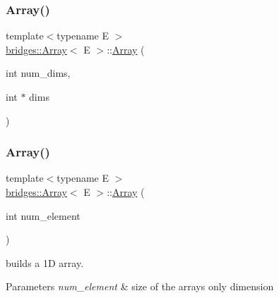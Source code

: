 \mbox{\label{classbridges_1_1_array_a25ff771f9ba7f365465f309ed2dd3688}} 
\subsubsection{\texorpdfstring{Array()}{Array()}\hspace{0.1cm}{\footnotesize\ttfamily [2/6]}}
{\footnotesize\ttfamily template$<$typename E $>$ \\
\mbox{\hyperlink{classbridges_1_1_array}{bridges\+::\+Array}}$<$ E $>$\+::\mbox{\hyperlink{classbridges_1_1_array}{Array}} (\begin{DoxyParamCaption}\item[{int}]{num\+\_\+dims,  }\item[{int $\ast$}]{dims }\end{DoxyParamCaption})\hspace{0.3cm}{\ttfamily [inline]}}

\mbox{\label{classbridges_1_1_array_a859819bc374aa90fcd84b1314034fbbf}} 
\subsubsection{\texorpdfstring{Array()}{Array()}\hspace{0.1cm}{\footnotesize\ttfamily [3/6]}}
{\footnotesize\ttfamily template$<$typename E $>$ \\
\mbox{\hyperlink{classbridges_1_1_array}{bridges\+::\+Array}}$<$ E $>$\+::\mbox{\hyperlink{classbridges_1_1_array}{Array}} (\begin{DoxyParamCaption}\item[{int}]{num\+\_\+element }\end{DoxyParamCaption})\hspace{0.3cm}{\ttfamily [inline]}}

builds a 1D array. 
\begin{DoxyParams}{Parameters}
{\em num\+\_\+element} & size of the array\textquotesingle{}s only dimension \\
\hline
\end{DoxyParams}
\mbox{\label{classbridges_1_1_array_a13b26fc4d2ccb19b277b2acc615efce2}} 
